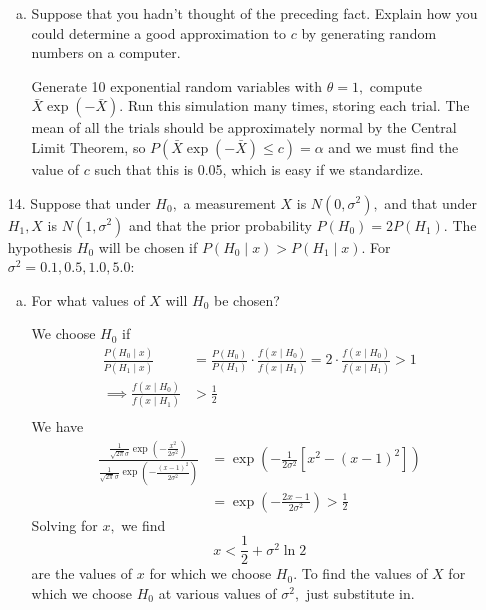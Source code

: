 \documentclass{article}
\begin{document}
\begin{itemize}
\begin{enumerate}[a.]
			\item Suppose that you hadn't thought of the preceding fact. Explain how you could determine a good approximation to $c$ by generating random numbers on a computer.
				\begin{answer*}
					Generate 10 exponential random variables with $\theta=1,$ compute $\bar{X} \exp(-\bar{X}).$ Run this simulation many times, storing each trial. The mean of all the trials should be approximately normal by the Central Limit Theorem, so $P(\bar{X}\exp(-\bar{X})\le c)=\alpha$ and we must find the value of $c$ such that this is 0.05, which is easy if we standardize.
				\end{answer*}
				
		\end{enumerate}

	\item[14.] Suppose that under $H_0,$ a measurement $X$ is $N(0, \sigma^2),$ and that under $H_1, X$ is $N(1, \sigma^2)$ and that the prior probability $P(H_0)=2P(H_1).$ The hypothesis $H_0$ will be chosen if $P(H_0\mid x)>P(H_1\mid x).$ For $\sigma^2=0.1, 0.5, 1.0, 5.0:$
		\begin{enumerate}[a.]
			\item For what values of $X$ will $H_0$ be chosen?
				\begin{soln}
					We choose $H_0$ if 
					\begin{align*}
						\frac{P(H_0\mid x)}{P(H_1\mid x)}&=\frac{P(H_0)}{P(H_1)}\cdot \frac{f(x\mid H_0)}{f(x\mid H_1)} = 2\cdot \frac{f(x\mid H_0)}{f(x\mid H_1)}>1\\
						\implies\frac{f(x\mid H_0)}{f(x\mid H_1)}&>\frac{1}{2} \\
					\end{align*}
					We have
					\begin{align*}
						\frac{\frac{1}{\sqrt{2\pi}\sigma}\exp\left( -\frac{x^2}{2\sigma^2} \right)}{\frac{1}{\sqrt{2\pi}\sigma}\exp\left( -\frac{(x-1)^2}{2\sigma^2} \right)} &= \exp\left( -\frac{1}{2\sigma^2}\left[ x^2-(x-1)^2 \right] \right) \\
						&= \exp\left( -\frac{2x-1}{2\sigma^2} \right) >\frac{1}{2}
					\end{align*}
					Solving for $x,$ we find \[x<\frac{1}{2}+\sigma^2\ln 2\] are the values of $x$ for which we choose $H_0.$ To find the values of $X$ for which we choose $H_0$ at various values of $\sigma^2,$ just substitute in.
					
				\end{soln}


\end{enumerate}
\end{itemize}
\end{document}
